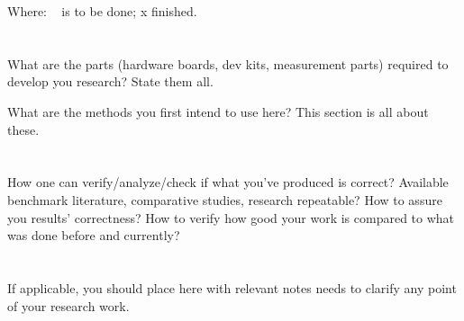 Where: \ck~ is to be done; x  finished.


\section{\sectionVI}
\label{sec:parts-methods}
What are the parts (hardware boards, dev kits, measurement parts) required to develop you research? State them all.

What are the methods you first intend to use here? This section is all about these.


\section{\sectionVII}
\label{sec:result-analysis}
How one can verify/analyze/check if what you've produced is correct? Available benchmark literature, comparative studies, research repeatable? How to assure you results' correctness? How to verify how good your work is compared to what was done before and currently?


\section{\sectionVIII}
\label{sec:general-notes}
If applicable, you should place here with relevant notes needs to clarify any point of your research work.


\listoftodos